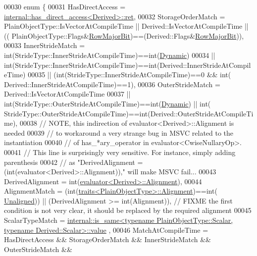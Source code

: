 \begin{DoxyCode}
00030     \textcolor{keyword}{enum} \{
00031       HasDirectAccess = \hyperlink{struct_eigen_1_1internal_1_1has__direct__access}{internal::has\_direct\_access<Derived>::ret},
00032       StorageOrderMatch = PlainObjectType::IsVectorAtCompileTime || Derived::IsVectorAtCompileTime || ((
      PlainObjectType::Flags&\hyperlink{group__flags_gae4f56c2a60bbe4bd2e44c5b19cbe8762}{RowMajorBit})==(Derived::Flags&\hyperlink{group__flags_gae4f56c2a60bbe4bd2e44c5b19cbe8762}{RowMajorBit})),
00033       InnerStrideMatch = \textcolor{keywordtype}{int}(StrideType::InnerStrideAtCompileTime)==int(\hyperlink{namespace_eigen_ad81fa7195215a0ce30017dfac309f0b2}{Dynamic})
00034                       || int(StrideType::InnerStrideAtCompileTime)==int(Derived::InnerStrideAtCompileTime)
00035                       || (int(StrideType::InnerStrideAtCompileTime)==0 && int(
      Derived::InnerStrideAtCompileTime)==1),
00036       OuterStrideMatch = Derived::IsVectorAtCompileTime
00037                       || \textcolor{keywordtype}{int}(StrideType::OuterStrideAtCompileTime)==int(\hyperlink{namespace_eigen_ad81fa7195215a0ce30017dfac309f0b2}{Dynamic}) || int(
      StrideType::OuterStrideAtCompileTime)==int(Derived::OuterStrideAtCompileTime),
00038       \textcolor{comment}{// NOTE, this indirection of evaluator<Derived>::Alignment is needed}
00039       \textcolor{comment}{// to workaround a very strange bug in MSVC related to the instantiation}
00040       \textcolor{comment}{// of has\_*ary\_operator in evaluator<CwiseNullaryOp>.}
00041       \textcolor{comment}{// This line is surprisingly very sensitive. For instance, simply adding parenthesis}
00042       \textcolor{comment}{// as "DerivedAlignment = (int(evaluator<Derived>::Alignment))," will make MSVC fail...}
00043       DerivedAlignment = int(\hyperlink{struct_eigen_1_1internal_1_1evaluator}{evaluator<Derived>::Alignment}),
00044       AlignmentMatch = (int(\hyperlink{struct_eigen_1_1internal_1_1traits}{traits<PlainObjectType>::Alignment})==int(
      \hyperlink{group__enums_gga45fe06e29902b7a2773de05ba27b47a1ac935220b4c844108e183ebe30a4d5204}{Unaligned})) || (DerivedAlignment >= \textcolor{keywordtype}{int}(Alignment)), \textcolor{comment}{// FIXME the first condition is not very
       clear, it should be replaced by the required alignment}
00045       ScalarTypeMatch = 
      \hyperlink{struct_eigen_1_1internal_1_1is__same}{internal::is\_same<typename PlainObjectType::Scalar, typename Derived::Scalar>::value}
      ,
00046       MatchAtCompileTime = HasDirectAccess && StorageOrderMatch && InnerStrideMatch && OuterStrideMatch && 

\end{DoxyCode}
